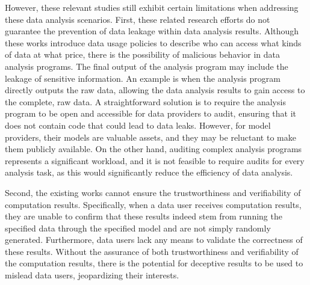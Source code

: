 However, these relevant studies still exhibit certain limitations when addressing these data analysis scenarios. 
First, these related research efforts do not guarantee the prevention of data leakage within data analysis results. Although these works introduce data usage policies to describe who can access what kinds of data at what price, there is the possibility of malicious behavior in data analysis programs. The final output of the analysis program may include the leakage of sensitive information. An example is when the analysis program directly outputs the raw data, allowing the data analysis results to gain access to the complete, raw data.
A straightforward solution is to require the analysis program to be open and accessible for data providers to audit, ensuring that it does not contain code that could lead to data leaks. However, for model providers, their models are valuable assets, and they may be reluctant to make them publicly available. On the other hand, auditing complex analysis programs represents a significant workload, and it is not feasible to require audits for every analysis task, as this would significantly reduce the efficiency of data analysis.

Second, the existing works cannot ensure the trustworthiness and verifiability of computation results. Specifically, when a data user receives computation results, they are unable to confirm that these results indeed stem from running the specified data through the specified model and are not simply randomly generated. Furthermore, data users lack any means to validate the correctness of these results. Without the assurance of both trustworthiness and verifiability of the computation results, there is the potential for deceptive results to be used to mislead data users, jeopardizing their interests.

